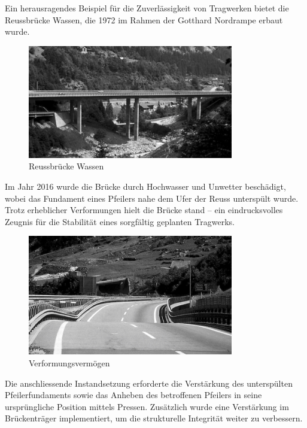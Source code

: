 Ein herausragendes Beispiel für die Zuverlässigkeit von Tragwerken bietet die Reussbrücke Wassen, die 1972 im Rahmen der Gotthard Nordrampe erbaut wurde. 
\begin{figure} [h]
	\centering
	\includegraphics[width=0.8\textwidth]{papers/balken/images/teil3/ReussbrueckeWassen1.jpg}
	\caption{Reussbrücke Wassen}
	\label{fig:Reussbrücke-Wassen}
\end{figure}
Im Jahr 2016 wurde die Brücke durch Hochwasser und Unwetter beschädigt, wobei das Fundament eines Pfeilers nahe dem Ufer der Reuss unterspült wurde. 
Trotz erheblicher Verformungen hielt die Brücke stand – ein eindrucksvolles Zeugnis für die Stabilität eines sorgfältig geplanten Tragwerks.
\begin{figure}
\begin{center}
\includegraphics[width=0.8\textwidth]{papers/balken/images/teil3/ReussbrueckeWassen2.jpg}
\end{center}
\caption{Verformungsvermögen}
\end{figure}
Die anschliessende Instandsetzung erforderte die Verstärkung des unterspülten Pfeilerfundaments sowie das Anheben des betroffenen Pfeilers in seine ursprüngliche Position mittels Pressen. 
Zusätzlich wurde eine Verstärkung im Brückenträger implementiert, um die strukturelle Integrität weiter zu verbessern. 
